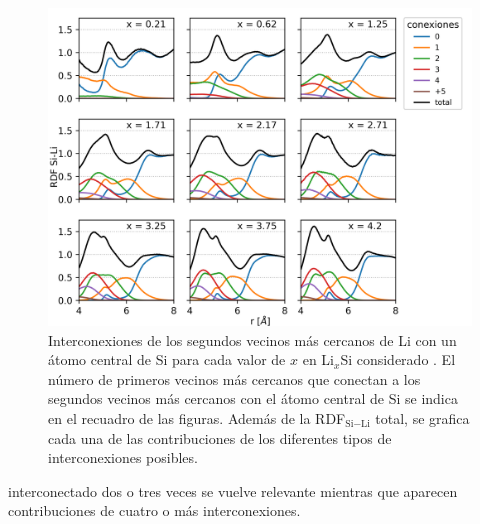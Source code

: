 \begin{figure}[h!]
    \centering
    \includegraphics[width=\textwidth]{Silicio/caracterizacion/resultados/interconexion/interconexiones.png}
    \caption{Interconexiones de los segundos vecinos más cercanos de Li con un 
    átomo central de Si para cada valor de $x$ en Li$_x$Si considerado \cite{ding2015}. El número 
    de primeros vecinos más cercanos que conectan a los segundos vecinos más 
    cercanos con el átomo central de Si se indica en el recuadro de las figuras. 
    Además de la RDF$_{\text{Si}-\text{Li}}$ total, se grafica cada una de las contribuciones 
    de los diferentes tipos de interconexiones posibles.}
    \label{fig:interconexiones}
\end{figure}
interconectado dos o
tres veces se vuelve relevante mientras que aparecen contribuciones de cuatro o
más interconexiones.

